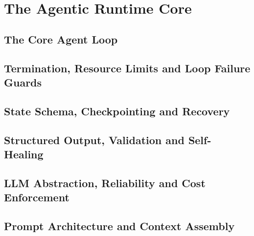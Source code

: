 \part{The Agentic Runtime Core}
\label{part:core}

\chapter{The Core Agent Loop}
\label{chap:core-loop}


\chapter{Termination, Resource Limits and Loop Failure Guards}
\label{chap:termination}



\chapter{State Schema, Checkpointing and Recovery}
\label{chap:checkpointing}


\chapter{Structured Output, Validation and Self-Healing}
\label{chap:structured-output}


\chapter{LLM Abstraction, Reliability and Cost Enforcement}
\label{chap:llm-abstraction}


\chapter{Prompt Architecture and Context Assembly}
\label{chap:context-assembly}



